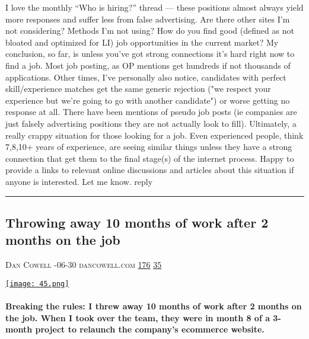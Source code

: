 \documentclass[10pt,a4paper]{article}
\begin{document}
\begin{multicols*}{2}
I love the monthly “Who is hiring?” thread — these positions almost always yield more responses and suffer less from false advertising.
Are there other sites I’m not considering? Methods I’m not using? How do you find good (defined as not bloated and optimized for LI) job opportunities in the current market?
My conclusion, so far, is unless you've got strong connections it's hard right now to find a job. Most job posting, as OP mentions get hundreds if not thousands of applications. Other times, I've personally also notice, candidates with perfect skill/experience matches get the same generic rejection ("we respect your experience but we're going to go with another candidate") or worse getting no response at all. There have been mentions of pseudo job posts (ie companies are just falsely advertising positions they are not actually look to fill). Ultimately, a really crappy situation for those looking for a job. Even experienced people, think 7,8,10+ years of experience, are seeing similar things unless they have a strong connection that get them to the final stage(s) of the internet process.
Happy to provide a links to relevant online discussions and articles about this situation if anyone is interested. Let me know.
reply
\par\noindent\textcolor{red}{\rule{\linewidth}{0.2mm}}
\vfill
\null
\noindent\begin{minipage}{\linewidth}
\subsection{Throwing away 10 months of work after 2 months on the job}
\textsc{\footnotesize
{\scriptsize\faUser}\space 
Dan Cowell 
{\scriptsize\faCalendar}-06-30 
{\scriptsize\faGlobe}\space 
dancowell.com 
{\scriptsize\faThumbsOUp}\space 
\href{http://news.ycombinator.com/item?id=37167833\&utm\_term=comment}{176} 
{\scriptsize\faComments}\space 
\href{http://news.ycombinator.com/item?id=37167833\&utm\_term=comment}{35} 
}
\par\medskip\noindent
\href{https://www.dancowell.com/breaking-the-rules/?utm\_source=hackernewsletter\&utm\_medium=email\&utm\_term=working}{
    \texttt{[image: 45.png]}
}
\end{minipage}
\paragraph{}
\textbf{Breaking the rules: I threw away 10 months of work after 2 months on the job.
When I took over the team, they were in month 8 of a 3-month project to relaunch the company's ecommerce website.}

\end{multicols*}
\end{document}

